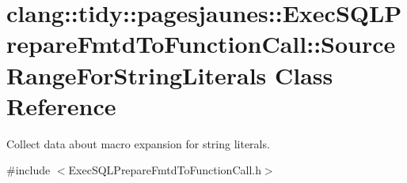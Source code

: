\hypertarget{classclang_1_1tidy_1_1pagesjaunes_1_1_exec_s_q_l_prepare_fmtd_to_function_call_1_1_source_range_for_string_literals}{}\section{clang\+:\+:tidy\+:\+:pagesjaunes\+:\+:Exec\+S\+Q\+L\+Prepare\+Fmtd\+To\+Function\+Call\+:\+:Source\+Range\+For\+String\+Literals Class Reference}
\label{classclang_1_1tidy_1_1pagesjaunes_1_1_exec_s_q_l_prepare_fmtd_to_function_call_1_1_source_range_for_string_literals}


Collect data about macro expansion for string literals.  




{\ttfamily \#include $<$Exec\+S\+Q\+L\+Prepare\+Fmtd\+To\+Function\+Call.\+h$>$}

